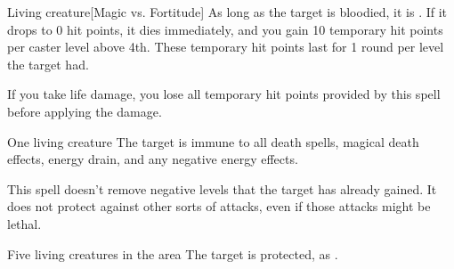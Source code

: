 \begin{spellheader}
    \spellrng{\rngmed}
\end{spellheader}
\begin{spelleffects}
    \begin{spelltarget}{Living creature}[Magic vs. Fortitude]
        \spellsuccess As long as the target is bloodied, it is \vulnerable. If it drops to 0 hit points, it dies immediately, and you gain 10 temporary hit points  per caster level above 4th. These temporary hit points last for 1 round per level the target had.
    \end{spelltarget}
\end{spelleffects}
\begin{spellfooter}
    \spellnotes If you take life damage, you lose all temporary hit points provided by this spell before applying the damage.
\end{spellfooter}

\begin{spellheader}
    \spellrng{\rngclose}
    \spelldur{\durshort}
\end{spellheader}
\begin{spelleffects}
    \begin{spelltarget}{One living creature}
        \spelleffect The target is immune to all death spells, magical death effects, energy drain, and any negative energy effects.
    \end{spelltarget}
\end{spelleffects}
\begin{spellfooter}
    \spellnotes This spell doesn't remove negative levels that the target has already gained. It does not protect against other sorts of attacks, even if those attacks might be lethal.
\end{spellfooter}

\begin{spellheader}
    \spelldur{\durshort}
\end{spellheader}
\begin{spelleffects}
    \begin{spelltarget}{Five living creatures in the area}
        \spelleffect The target is protected, as .
    \end{spelltarget}
\end{spelleffects}
\begin{spellfooter}
    
\end{spellfooter}

